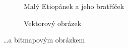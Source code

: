 \documentclass[a4paper, 11pt]{article}
\begin{document}
\begin{figure}[h]
{			
		}
		\caption{Malý Etiopánek a jeho bratříček}
		\label{figure:malyetiopan}
    \end{figure}
    \newpage
    \begin{figure}[h]
		\centering
		\caption{Vektorový obrázek}
		\label{figure:vektorovy}
    \end{figure}
    \bigskip
    \noindent \dots a bitmapovým obrázkem
\end{document}
